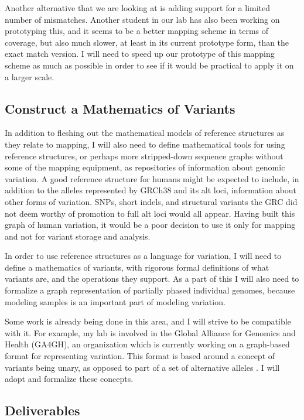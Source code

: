 \documentclass[11pt,proposal]{ucthesis}
\begin{document}
Another alternative that we are looking at is adding support for a limited number of mismatches. Another student in our lab has also been working on prototyping this, and it seems to be a better mapping scheme in terms of coverage, but also much slower, at least in its current prototype form, than the exact match version. I will need to speed up our prototype of this mapping scheme as much as possible in order to see if it would be practical to apply it on a larger scale.

\subsection{Construct a Mathematics of Variants}
\label{subsec:aim1math}

In addition to fleshing out the mathematical models of reference structures as they relate to mapping, I will also need to define mathematical tools for using reference structures, or perhaps more stripped-down sequence graphs without some of the mapping equipment, as repositories of information about genomic variation. A good reference structure for humans might be expected to include, in addition to the alleles represented by GRCh38 and its alt loci, information about other forms of variation. SNPs, short indels, and structural variants the GRC did not deem worthy of promotion to full alt loci would all appear. Having built this graph of human variation, it would be a poor decision to use it only for mapping and not for variant storage and analysis.

In order to use reference structures as a language for variation, I will need to define a mathematics of variants, with rigorous formal definitions of what variants are, and the operations they support. As a part of this I will also need to formalize a graph representation of partially phased individual genomes, because modeling samples is an important part of modeling variation.

Some work is already being done in this area, and I will strive to be compatible with it. For example, my lab is involved in the Global Alliance for Genomics and Health (GA4GH), an organization which is currently working on a graph-based format for representing variation. This format is based around a concept of variants being unary, as opposed to part of a set of alternative alleles \cite{ga4gh2014variation}. I will adopt and formalize these concepts.

\subsection{Deliverables}
\label{subsec:aim1deliverables}
\end{document}
